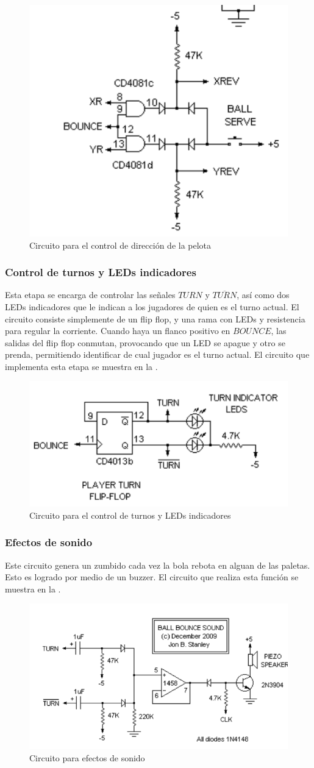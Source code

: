\begin{figure}[H]
    \centering
    \includegraphics[width=0.5\linewidth]{figs/descripcion/controlPelota.png}
    \caption{Circuito para el control de dirección de la pelota \cite{pong}}
    \label{controlPelota}
\end{figure}

\subsubsection{Control de turnos y LEDs indicadores}
Esta etapa se encarga de controlar las señales $TURN$ y $\overline{TURN}$, así como dos LEDs indicadores que le indican a los jugadores de quien es el turno actual. 
El circuito consiste simplemente de un flip flop, y una rama con LEDs y resistencia para regular la corriente. 
Cuando haya un flanco positivo en $BOUNCE$, las salidas del flip flop conmutan, provocando que un LED se apague y otro se prenda, permitiendo identificar de cual jugador es el turno actual.
El circuito que implementa esta etapa se muestra en la .

\begin{figure}[H]
    \centering
    \includegraphics[width=0.5\linewidth]{figs/descripcion/turnos.png}
    \caption{Circuito para el control de turnos y LEDs indicadores \cite{pong}}
    \label{turnos}
\end{figure}

\subsubsection{Efectos de sonido}
Este circuito genera un zumbido cada vez la bola rebota en alguan de las paletas.
Esto es logrado por medio de un buzzer.
El circuito que realiza esta función se muestra en la .

\begin{figure}[H]
    \centering
    \includegraphics[width=0.5\linewidth]{figs/descripcion/sonido.png}
    \caption{Circuito para efectos de sonido \cite{pong}}
    \label{sonido}
\end{figure}